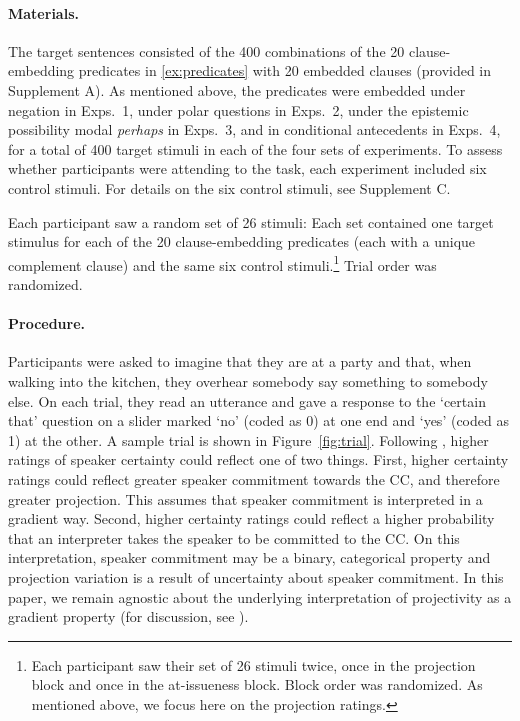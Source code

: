\documentclass[a4paper,12pt,twoside]{article}
\begin{document}
        \paragraph{Materials.}
            The target sentences consisted of the 400 combinations of the 20 clause-em\-bed\-ding predicates in \ref{ex:predicates} with 20 embedded clauses (provided in Supplement A). As mentioned above, the predicates were embedded under negation in Exps.~1, under polar questions in Exps.~2, under the epistemic possibility modal \emph{perhaps} in Exps.~3, and in conditional antecedents in Exps.~4, for a total of 400 target stimuli in each of the four sets of experiments. To assess whether participants were attending to the task, each experiment included six control stimuli. For details on the six control stimuli, see Supplement C.

            Each participant saw a random set of 26 stimuli: Each set contained one target stimulus for each of the 20 clause-embedding predicates (each with a unique complement clause) and the same six control stimuli.\footnote{Each participant saw their set of 26 stimuli twice, once in the projection block and once in the at-issueness block. Block order was randomized. As mentioned above, we focus here on the projection ratings.} Trial order was randomized.
		
        \paragraph{Procedure.}
            Participants were asked to imagine that they are at a party and that, when walking into the kitchen, they overhear somebody say something to somebody else.
            On each trial, they read an utterance and gave a response to the `certain that' question on a slider marked `no' (coded as 0) at one end and `yes' (coded as 1) at the other. A sample trial %
            is shown in Figure~\ref{fig:trial}.            
            Following \citealt{tonhauser_how_2018}, higher ratings of speaker certainty could reflect one of two things. First, higher certainty ratings could reflect greater speaker commitment towards the CC, and therefore greater projection. This assumes that speaker commitment is interpreted in a gradient way. Second, higher certainty ratings could reflect a higher probability that an interpreter takes the speaker to be committed to the CC.  On this interpretation, speaker commitment may be a binary, categorical property and projection variation is a result of uncertainty about speaker commitment. In this paper, we remain agnostic about the underlying interpretation of projectivity as a gradient property (for discussion, see  \citealt{grove_factivity_2023}).
            
\end{document}
